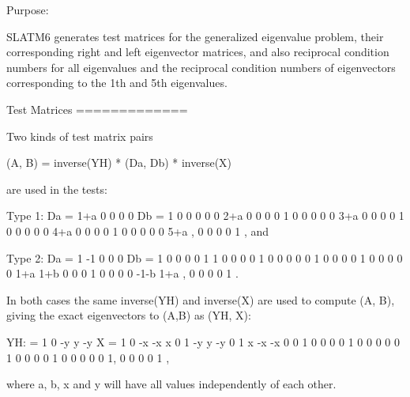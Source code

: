 \begin{DoxyParagraph}{Purpose\+: }
\begin{DoxyVerb} SLATM6 generates test matrices for the generalized eigenvalue
 problem, their corresponding right and left eigenvector matrices,
 and also reciprocal condition numbers for all eigenvalues and
 the reciprocal condition numbers of eigenvectors corresponding to
 the 1th and 5th eigenvalues.

 Test Matrices
 =============

 Two kinds of test matrix pairs

       (A, B) = inverse(YH) * (Da, Db) * inverse(X)

 are used in the tests:

 Type 1:
    Da = 1+a   0    0    0    0    Db = 1   0   0   0   0
          0   2+a   0    0    0         0   1   0   0   0
          0    0   3+a   0    0         0   0   1   0   0
          0    0    0   4+a   0         0   0   0   1   0
          0    0    0    0   5+a ,      0   0   0   0   1 , and

 Type 2:
    Da =  1   -1    0    0    0    Db = 1   0   0   0   0
          1    1    0    0    0         0   1   0   0   0
          0    0    1    0    0         0   0   1   0   0
          0    0    0   1+a  1+b        0   0   0   1   0
          0    0    0  -1-b  1+a ,      0   0   0   0   1 .

 In both cases the same inverse(YH) and inverse(X) are used to compute
 (A, B), giving the exact eigenvectors to (A,B) as (YH, X):

 YH:  =  1    0   -y    y   -y    X =  1   0  -x  -x   x
         0    1   -y    y   -y         0   1   x  -x  -x
         0    0    1    0    0         0   0   1   0   0
         0    0    0    1    0         0   0   0   1   0
         0    0    0    0    1,        0   0   0   0   1 ,

 where a, b, x and y will have all values independently of each other.\end{DoxyVerb}
 
\end{DoxyParagraph}

